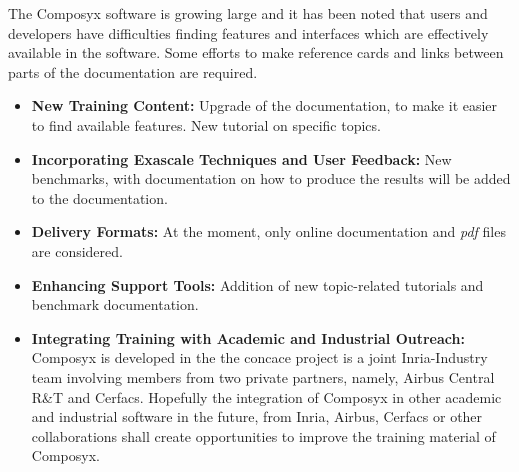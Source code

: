 The Composyx software is growing large and it has been noted that
users and developers have difficulties finding features and interfaces
which are effectively available in the software. Some efforts to make
reference cards and links between parts of the documentation are
required.

\begin{itemize}
\item \textbf{New Training Content:} Upgrade of the documentation, to
  make it easier to find available features. New tutorial on specific
  topics.
\item \textbf{Incorporating Exascale Techniques and User Feedback:}
  New benchmarks, with documentation on how to produce the results
  will be added to the documentation.
    \item \textbf{Delivery Formats:} At the moment, only online
      documentation and \textit{pdf} files are considered.
    \item \textbf{Enhancing Support Tools:} Addition of new
      topic-related tutorials and benchmark documentation.
    \item \textbf{Integrating Training with Academic and Industrial
        Outreach:} Composyx is developed in the the concace project is
      a joint Inria-Industry team involving members from two private
      partners, namely, Airbus Central R\&T and Cerfacs. Hopefully the
      integration of Composyx in other academic and industrial
      software in the future, from Inria, Airbus, Cerfacs or other
      collaborations shall create opportunities to improve the
      training material of Composyx.
\end{itemize}
